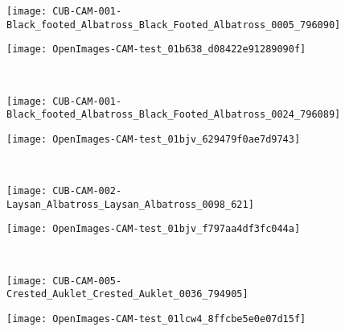 \documentclass[twocolumn]{article}
\theoremstyle{definition}
\begin{document}
\begin{figure*}
     \centering
     \begin{subfigure}[b]{0.49\textwidth}
         \centering
         \texttt{[image: CUB-CAM-001-Black\_footed\_Albatross\_Black\_Footed\_Albatross\_0005\_796090]}
     \end{subfigure}
     \hfill
     \begin{subfigure}[b]{0.49\textwidth}
         \centering
         \texttt{[image: OpenImages-CAM-test\_01b638\_d08422e91289090f]}
     \end{subfigure}
     \\
     \vspace{0.1cm}
     \begin{subfigure}[b]{0.49\textwidth}
         \centering
         \texttt{[image: CUB-CAM-001-Black\_footed\_Albatross\_Black\_Footed\_Albatross\_0024\_796089]}
     \end{subfigure}
     \hfill
     \begin{subfigure}[b]{0.49\textwidth}
         \centering
         \texttt{[image: OpenImages-CAM-test\_01bjv\_629479f0ae7d9743]}
     \end{subfigure}
     \\
     \vspace{0.1cm}
     \begin{subfigure}[b]{0.49\textwidth}
         \centering
         \texttt{[image: CUB-CAM-002-Laysan\_Albatross\_Laysan\_Albatross\_0098\_621]}
     \end{subfigure}
     \hfill
     \begin{subfigure}[b]{0.49\textwidth}
         \centering
         \texttt{[image: OpenImages-CAM-test\_01bjv\_f797aa4df3fc044a]}
     \end{subfigure}
     \\
     \vspace{0.1cm}
     \begin{subfigure}[b]{0.49\textwidth}
         \centering
         \texttt{[image: CUB-CAM-005-Crested\_Auklet\_Crested\_Auklet\_0036\_794905]}
     \end{subfigure}
     \hfill
     \begin{subfigure}[b]{0.49\textwidth}
         \centering
         \texttt{[image: OpenImages-CAM-test\_01lcw4\_8ffcbe5e0e07d15f]}
     \end{subfigure}
     \\
     \vspace{0.1cm}
     \begin{subfigure}[b]{0.49\textwidth}

\end{subfigure}
\end{figure*}
\end{document}
